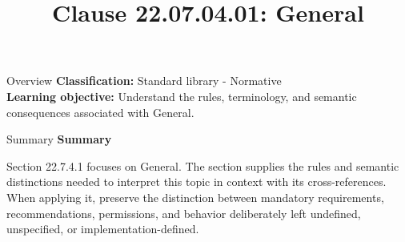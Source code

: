 \documentclass[10pt,letterpaper]{article}
\title{Clause 22.07.04.01: General}
\author{}
\date{}
\begin{document}
\maketitle
\begin{CornellOverviewBox}{Overview}
\textbf{Classification:} Standard library - Normative\\[2pt]
\textbf{Learning objective:} Understand the rules, terminology, and semantic consequences associated with General.
\end{CornellOverviewBox}\begin{CornellSummaryBox}{Summary}
{\sffamily\bfseries\color{Accent} Summary}\par\vspace{3pt}Section 22.7.4.1 focuses on General. The section supplies the rules and semantic distinctions needed to interpret this topic in context with its cross-references. When applying it, preserve the distinction between mandatory requirements, recommendations, permissions, and behavior deliberately left undefined, unspecified, or implementation-defined.
\end{CornellSummaryBox}
\end{document}

